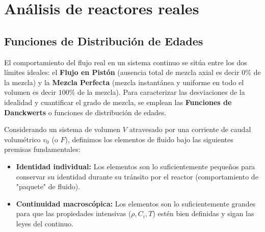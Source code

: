 \chapter{Análisis de reactores reales}
\section{Funciones de Distribución de Edades}
\begin{flushleft}
    El comportamiento del flujo real en un sistema continuo se sitúa entre los dos límites ideales: el \textbf{Flujo en Pistón} (ausencia total de mezcla axial es decir $0\%$ de la mezcla) y la \textbf{Mezcla Perfecta} (mezcla instantánea y uniforme en todo el volumen es decir $100\%$ de la mezcla). Para caracterizar las desviaciones de la idealidad y cuantificar el grado de mezcla, se emplean las \textbf{Funciones de Danckwerts} o funciones de distribución de edades.

    Considerando un sistema de volumen $V$ atravesado por una corriente de caudal volumétrico $v_0$ (o $F$), definimos los elementos de fluido bajo las siguientes premisas fundamentales:
\end{flushleft}
\begin{itemize}
    \item \textbf{Identidad individual:} Los elementos son lo suficientemente pequeños para conservar su identidad durante su tránsito por el reactor (comportamiento de "paquete" de fluido).
    \item \textbf{Continuidad macroscópica:} Los elementos son lo suficientemente grandes para que las propiedades intensivas ($\rho, C_i, T$) estén bien definidas y sigan las leyes del continuo.
\end{itemize}



